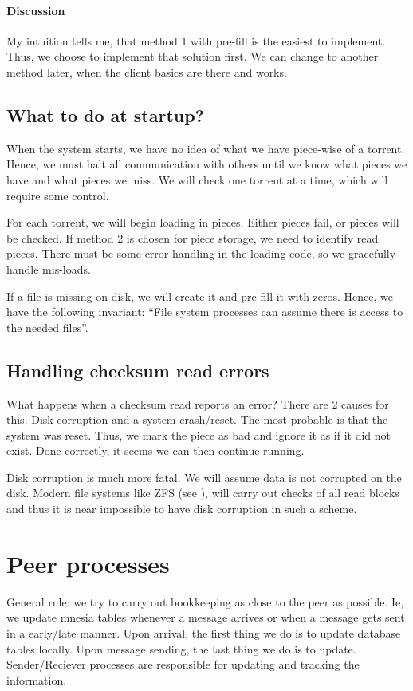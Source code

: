 \documentclass[a4paper]{memoir}
\begin{document}
\paragraph{Discussion}
My intuition tells me, that method 1 with pre-fill is the easiest to
implement. Thus, we choose to implement that solution first. We can
change to another method later, when the client basics are there and
works.

\subsection{What to do at startup?}
When the system starts, we have no idea of what we have piece-wise of
a torrent. Hence, we must halt all communication with others until we
know what pieces we have and what pieces we miss. We will check one
torrent at a time, which will require some control.

For each torrent, we will begin loading in pieces. Either pieces fail,
or pieces will be checked. If method 2 is chosen for piece storage, we
need to identify read pieces. There must be some error-handling in the
loading code, so we gracefully handle mis-loads.

If a file is missing on disk, we will create it and pre-fill it with
zeros. Hence, we have the following invariant: ``File system processes
can assume there is access to the needed files''.

\subsection{Handling checksum read errors}
What happens when a checksum read reports an error? There are 2 causes
for this: Disk corruption and a system crash/reset. The most probable
is that the system was reset. Thus, we mark the piece as bad and
ignore it as if it did not exist. Done correctly, it seems we can then
continue running.

Disk corruption is much more fatal. We will assume data is not
corrupted on the disk. Modern file systems like ZFS (see \cite{zfs}),
will carry out checks of all read blocks and thus it is near
impossible to have disk corruption in such a scheme.

\section{Peer processes}

General rule: we try to carry out bookkeeping as close to the peer as
possible. Ie, we update mnesia tables whenever a message arrives or
when a message gets sent in a early/late manner. Upon arrival, the
first thing we do is to update database tables locally. Upon message
sending, the last thing we do is to update. Sender/Reciever processes
are responsible for updating and tracking the information.
\end{document}
